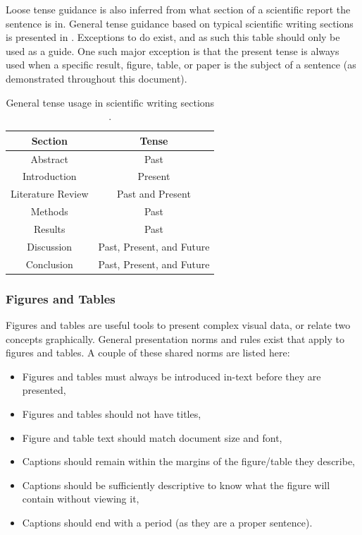 \noindent
Loose tense guidance is also inferred from what section of a scientific report the sentence is in. 
General tense guidance based on typical scientific writing sections is presented in . 
Exceptions to  do exist, and as such this table should only be used as a guide. 
One such major exception is that the present tense is always used when a specific result, figure, table, or paper is the subject of a sentence (as demonstrated throughout this document). 

\begin{table}[hbt!]
	\centering
	\begin{threeparttable}[b]
		\caption{General tense usage in scientific writing sections \cite{tenseScientificWriting}. \label{tab:tenseBasedOnSection}}
		\begin{tabular}{cc}
			\toprule
			\textbf{Section} & \textbf{Tense} \\ \midrule
			Abstract & Past \\
			Introduction & Present \\
			Literature Review & Past and Present \\
			Methods & Past \\
			Results & Past \\
			Discussion & Past, Present, and Future \\
			Conclusion & Past, Present, and Future \\ \bottomrule
		\end{tabular}
	\end{threeparttable}
\end{table}


\subsubsection{Figures and Tables} \label{sec:documentSetupFigureTableRules}

Figures and tables are useful tools to present complex visual data, or relate two concepts graphically. 
General presentation norms and rules exist that apply to figures and tables. 
A couple of these shared norms are listed here: 
\begin{itemize}
	\item Figures and tables must always be introduced in-text before they are presented, 
	\item Figures and tables should not have titles, 
	\item Figure and table text should match document size and font, 
	\item Captions should remain within the margins of the figure/table they describe, 
	\item Captions should be sufficiently descriptive to know what the figure will contain without viewing it, 
	\item Captions should end with a period (as they are a proper sentence).
\end{itemize}

